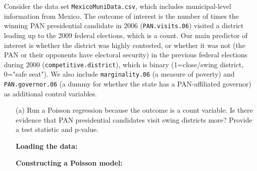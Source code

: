 \documentclass[12pt,letterpaper]{article}
\begin{document}
\noindent Consider the data set \texttt{MexicoMuniData.csv}, which includes municipal-level information from Mexico. The outcome of interest is the number of times the winning PAN presidential candidate in 2006 (\texttt{PAN.visits.06}) visited a district leading up to the 2009 federal elections, which is a count. Our main predictor of interest is whether the district was highly contested, or whether it was not (the PAN or their opponents have electoral security) in the previous federal elections during 2000 (\texttt{competitive.district}), which is binary (1=close/swing district, 0="safe seat"). We also include \texttt{marginality.06} (a measure of poverty) and \texttt{PAN.governor.06} (a dummy for whether the state has a PAN-affiliated governor) as additional control variables. 

\begin{enumerate}
	\item [(a)]
	Run a Poisson regression because the outcome is a count variable. Is there evidence that PAN presidential candidates visit swing districts more? Provide a test statistic and p-value.
	
	\vspace{.25cm}
	\textbf{Loading the data:}
	 
	
	\vspace{.25cm}
	\textbf{Constructing a Poisson model:}
	 
	


\end{enumerate}
\end{document}

